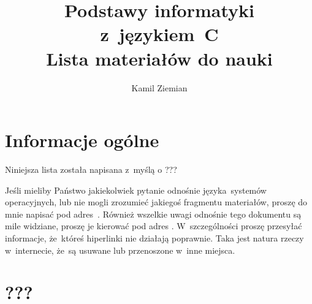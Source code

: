\documentclass[a4paper,11pt]{article}
\title{Podstawy informatyki z~językiem~C \\
  {\Large Lista materiałów do nauki}}
\author{Kamil Ziemian \\
  \email}
\begin{document}





\maketitle





\section{Informacje ogólne}

\label{sec:Informacje-ogólne}


Niniejsza lista została napisana z~myślą o ???%

Jeśli mieliby Państwo jakiekolwiek pytanie odnośnie języka~systemów
operacyjnych, lub nie mogli zrozumieć jakiegoś fragmentu materiałów,
proszę do mnie napisać pod adres~\email. Również wszelkie uwagi odnośnie
tego dokumentu są mile widziane, proszę je kierować pod adres \email.
W~szczególności proszę przesyłać informacje, że~któreś hiperlinki nie
działają poprawnie. Taka jest natura rzeczy w~internecie, że~są usuwane lub
przenoszone w~inne miejsca.










\section{???}

\label{sec:Informacje-ogólne}















\printbibliography






\end{document}
